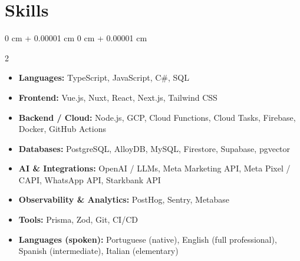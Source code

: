 \documentclass[10pt, a4paper]{article}
\newenvironment{onecolentry}{
    \begin{adjustwidth}{
        0 cm + 0.00001 cm
    }{
        0 cm + 0.00001 cm
    }
}{
    \end{adjustwidth}
}
\begin{document}
    \section{Skills}
    \vspace{0.1 cm}
    \begin{onecolentry}
        \setlength{\columnsep}{0.5cm}
        \begin{multicols}{2}
        \begin{itemize}[topsep=0.04cm, parsep=0.04cm, partopsep=0pt, itemsep=0pt, leftmargin=0cm+10pt]
            \item \textbf{Languages:} TypeScript, JavaScript, C\#, SQL
            \item \textbf{Frontend:} Vue.js, Nuxt, React, Next.js, Tailwind CSS
            \item \textbf{Backend / Cloud:} Node.js, GCP, Cloud Functions, Cloud Tasks, Firebase, Docker, GitHub Actions
            \item \textbf{Databases:} PostgreSQL, AlloyDB, MySQL, Firestore, Supabase, pgvector
            \columnbreak
            \item \textbf{AI \& Integrations:} OpenAI / LLMs, Meta Marketing API, Meta Pixel / CAPI, WhatsApp API, Starkbank API
            \item \textbf{Observability \& Analytics:} PostHog, Sentry, Metabase
            \item \textbf{Tools:} Prisma, Zod, Git, CI/CD
            \item \textbf{Languages (spoken):} Portuguese (native), English (full professional), Spanish (intermediate), Italian (elementary)
        \end{itemize}
        \end{multicols}
    \end{onecolentry}
\end{document}
